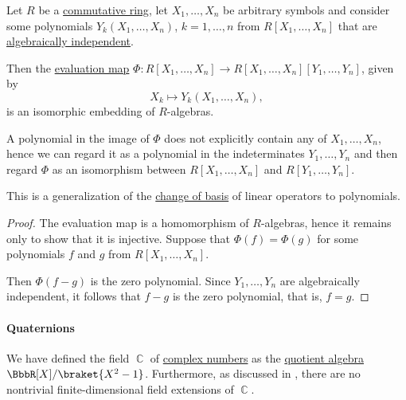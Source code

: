 \begin{proposition}\label{thm:change_of_polynomial_basis}
  Let \( R \) be a \hyperref[def:ring/commutative]{commutative ring}, let \( X_1, \ldots, X_n \) be arbitrary symbols and consider some polynomials \( Y_k(X_1, \ldots, X_n) \), \( k = 1, \ldots, n \) from \( R[X_1, \ldots, X_n] \) that are \hyperref[def:algebraic_dependence]{algebraically independent}.

  Then the \hyperref[thm:polynomial_algebra_universal_property]{evaluation map} \( \Phi: R[X_1, \ldots, X_n] \to R[X_1, \ldots, X_n][Y_1, \ldots, Y_n] \), given by
  \begin{equation*}
    X_k \mapsto Y_k(X_1, \ldots, X_n),
  \end{equation*}
  is an isomorphic embedding of \( R \)-algebras.
\end{proposition}
\begin{comments}
  \item A polynomial in the image of \( \Phi \) does not explicitly contain any of \( X_1, \ldots, X_n \), hence we can regard it as a polynomial in the indeterminates \( Y_1, \ldots, Y_n \) and then regard \( \Phi \) as an isomorphism between \( R[X_1, \ldots, X_n] \) and \( R[Y_1, \ldots, Y_n] \).

  \item This is a generalization of the \hyperref[con:change_of_basis]{change of basis} of linear operators to polynomials.
\end{comments}
\begin{proof}
  The evaluation map is a homomorphism of \( R \)-algebras, hence it remains only to show that it is injective. Suppose that \( \Phi(f) = \Phi(g) \) for some polynomials \( f \) and \( g \) from \( R[X_1, \ldots, X_n] \).

  Then \( \Phi(f - g) \) is the zero polynomial. Since \( Y_1, \ldots, Y_n \) are algebraically independent, it follows that \( f - g \) is the zero polynomial, that is, \( f = g \).
\end{proof}

\paragraph{Quaternions}\hfill

We have defined the field \( \BbbC \) of \hyperref[def:complex_numbers]{complex numbers} as the \hyperref[def:algebra_over_ring/quotient]{quotient algebra} \( \BbbR[X] / \braket{ X^2 - 1 } \). Furthermore, as discussed in , there are no nontrivial finite-dimensional field extensions of \( \BbbC \).

